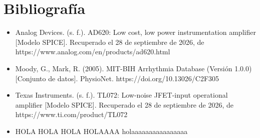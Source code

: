 \section{Bibliografía}

\begin{itemize}
    \item Analog Devices. (s. f.). AD620: Low cost, low power instrumentation amplifier [Modelo SPICE]. Recuperado el 28 de septiembre de 2026, de https://www.analog.com/en/products/ad620.html
    \item Moody, G., Mark, R. (2005). MIT-BIH Arrhythmia Database (Versión 1.0.0) [Conjunto de datos]. PhysioNet. https://doi.org/10.13026/C2F305
    \item Texas Instruments. (s. f.). TL072: Low-noise JFET-input operational amplifier [Modelo SPICE]. Recuperado el 28 de septiembre de 2026, de https://www.ti.com/product/TL072
    \item HOLA HOLA HOLA HOLAAAA holaaaaaaaaaaaaaaaa
\end{itemize}